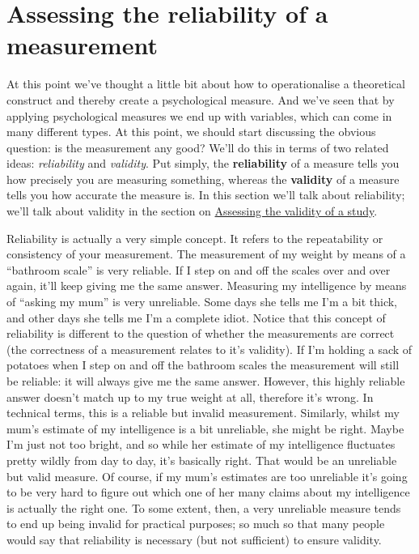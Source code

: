 \documentclass[
  a4paper,
]{book}
\begin{document}
\hypertarget{sec-Assessing-the-reliability-of-a-measurement}{%
\section{Assessing the reliability of a
measurement}\label{sec-Assessing-the-reliability-of-a-measurement}}

At this point we've thought a little bit about how to operationalise a
theoretical construct and thereby create a psychological measure. And
we've seen that by applying psychological measures we end up with
variables, which can come in many different types. At this point, we
should start discussing the obvious question: is the measurement any
good? We'll do this in terms of two related ideas: \emph{reliability}
and \emph{validity}. Put simply, the \textbf{reliability} of a measure
tells you how precisely you are measuring something, whereas the
\textbf{validity} of a measure tells you how accurate the measure is. In
this section we'll talk about reliability; we'll talk about validity in
the section on
\protect\hyperlink{assessing-the-validity-of-a-study}{Assessing the
validity of a study}.

Reliability is actually a very simple concept. It refers to the
repeatability or consistency of your measurement. The measurement of my
weight by means of a ``bathroom scale'' is very reliable. If I step on
and off the scales over and over again, it'll keep giving me the same
answer. Measuring my intelligence by means of ``asking my mum'' is very
unreliable. Some days she tells me I'm a bit thick, and other days she
tells me I'm a complete idiot. Notice that this concept of reliability
is different to the question of whether the measurements are correct
(the correctness of a measurement relates to it's validity). If I'm
holding a sack of potatoes when I step on and off the bathroom scales
the measurement will still be reliable: it will always give me the same
answer. However, this highly reliable answer doesn't match up to my true
weight at all, therefore it's wrong. In technical terms, this is a
reliable but invalid measurement. Similarly, whilst my mum's estimate of
my intelligence is a bit unreliable, she might be right. Maybe I'm just
not too bright, and so while her estimate of my intelligence fluctuates
pretty wildly from day to day, it's basically right. That would be an
unreliable but valid measure. Of course, if my mum's estimates are too
unreliable it's going to be very hard to figure out which one of her
many claims about my intelligence is actually the right one. To some
extent, then, a very unreliable measure tends to end up being invalid
for practical purposes; so much so that many people would say that
reliability is necessary (but not sufficient) to ensure validity.
\end{document}
